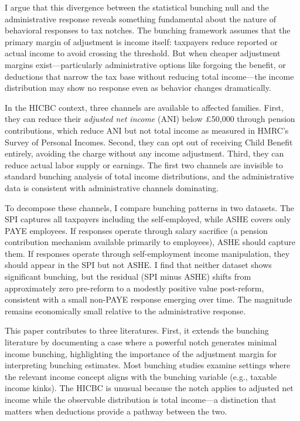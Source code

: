 \documentclass[12pt]{article}
\begin{document}
I argue that this divergence between the statistical bunching null and the administrative response reveals something fundamental about the nature of behavioral responses to tax notches. The bunching framework assumes that the primary margin of adjustment is income itself: taxpayers reduce reported or actual income to avoid crossing the threshold. But when cheaper adjustment margins exist---particularly administrative options like forgoing the benefit, or deductions that narrow the tax base without reducing total income---the income distribution may show no response even as behavior changes dramatically.

In the HICBC context, three channels are available to affected families. First, they can reduce their \emph{adjusted net income} (ANI) below \pounds50,000 through pension contributions, which reduce ANI but not total income as measured in HMRC's Survey of Personal Incomes. Second, they can opt out of receiving Child Benefit entirely, avoiding the charge without any income adjustment. Third, they can reduce actual labor supply or earnings. The first two channels are invisible to standard bunching analysis of total income distributions, and the administrative data is consistent with administrative channels dominating.

To decompose these channels, I compare bunching patterns in two datasets. The SPI captures all taxpayers including the self-employed, while ASHE covers only PAYE employees. If responses operate through salary sacrifice (a pension contribution mechanism available primarily to employees), ASHE should capture them. If responses operate through self-employment income manipulation, they should appear in the SPI but not ASHE. I find that neither dataset shows significant bunching, but the residual (SPI minus ASHE) shifts from approximately zero pre-reform to a modestly positive value post-reform, consistent with a small non-PAYE response emerging over time. The magnitude remains economically small relative to the administrative response.

This paper contributes to three literatures. First, it extends the bunching literature \citep{saez2010, kleven2013, chetty2011, bastani2021} by documenting a case where a powerful notch generates minimal income bunching, highlighting the importance of the adjustment margin for interpreting bunching estimates. Most bunching studies examine settings where the relevant income concept aligns with the bunching variable (e.g., taxable income kinks). The HICBC is unusual because the notch applies to adjusted net income while the observable distribution is total income---a distinction that matters when deductions provide a pathway between the two.
\end{document}
